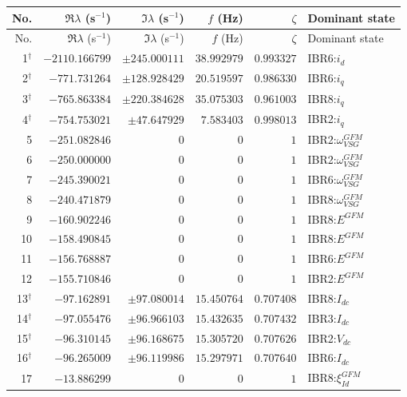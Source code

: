 \begingroup\footnotesize\setlength{\tabcolsep}{3pt}
\begin{longtable}{@{}r r r r r l@{}}
\toprule
No. & $\Re\lambda$ (s$^{-1}$) & $\Im\lambda$ (s$^{-1}$) & $f$ (Hz) & $\zeta$ & Dominant state \\ \midrule
\endfirsthead
\toprule
No. & $\Re\lambda$ (s$^{-1}$) & $\Im\lambda$ (s$^{-1}$) & $f$ (Hz) & $\zeta$ & Dominant state \\ \midrule
\endhead
1$^{\dagger}$ & $-2110.166799$ & $\pm245.000111$ & $38.992979$ & $0.993327$ & IBR6:$i_d$ \\ 
2$^{\dagger}$ & $-771.731264$ & $\pm128.928429$ & $20.519597$ & $0.986330$ & IBR6:$i_q$ \\ 
3$^{\dagger}$ & $-765.863384$ & $\pm220.384628$ & $35.075303$ & $0.961003$ & IBR8:$i_q$ \\ 
4$^{\dagger}$ & $-754.753021$ & $\pm47.647929$ & $7.583403$ & $0.998013$ & IBR2:$i_q$ \\ 
5 & $-251.082846$ & $0$ & $0$ & $1$ & IBR2:$\omega_{VSG}^{GFM}$ \\ 
6 & $-250.000000$ & $0$ & $0$ & $1$ & IBR2:$\omega_{VSG}^{GFM}$ \\ 
7 & $-245.390021$ & $0$ & $0$ & $1$ & IBR6:$\omega_{VSG}^{GFM}$ \\ 
8 & $-240.471879$ & $0$ & $0$ & $1$ & IBR8:$\omega_{VSG}^{GFM}$ \\ 
9 & $-160.902246$ & $0$ & $0$ & $1$ & IBR8:$E^{GFM}$ \\ 
10 & $-158.490845$ & $0$ & $0$ & $1$ & IBR8:$E^{GFM}$ \\ 
11 & $-156.768887$ & $0$ & $0$ & $1$ & IBR6:$E^{GFM}$ \\ 
12 & $-155.710846$ & $0$ & $0$ & $1$ & IBR2:$E^{GFM}$ \\ 
13$^{\dagger}$ & $-97.162891$ & $\pm97.080014$ & $15.450764$ & $0.707408$ & IBR8:$I_{dc}$ \\ 
14$^{\dagger}$ & $-97.055476$ & $\pm96.966103$ & $15.432635$ & $0.707432$ & IBR3:$I_{dc}$ \\ 
15$^{\dagger}$ & $-96.310145$ & $\pm96.168675$ & $15.305720$ & $0.707626$ & IBR2:$V_{dc}$ \\ 
16$^{\dagger}$ & $-96.265009$ & $\pm96.119986$ & $15.297971$ & $0.707640$ & IBR6:$I_{dc}$ \\ 
17 & $-13.886299$ & $0$ & $0$ & $1$ & IBR8:$\xi_{Id}^{GFM}$ \\ 

\end{longtable}
